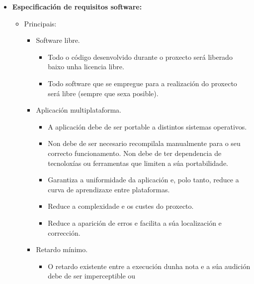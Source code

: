  \begin{itemize}
   \item \textbf{Especificación de requisitos software:}
         \begin{itemize}
          \item Principais:
                \begin{itemize}
                 \item Software libre.
                       \begin{itemize}
                        \item Todo o código desenvolvido durante o proxecto
                              será liberado baixo unha licencia libre.
                        \item Todo software que se empregue para a realización
                              do proxecto será libre  (sempre que sexa
                              posible).
                       \end{itemize}
                 \item Aplicación multiplataforma.
                       \begin{itemize}
                        \item A aplicación debe de ser portable a distintos
                              sistemas operativos.
                        \item Non debe de ser necesario recompilala manualmente
                              para o seu correcto funcionamento.
                              Non debe de ter dependencia de tecnoloxías ou
                              ferramentas que limiten a súa portabilidade.
                        \item Garantiza a uniformidade da aplicación e, polo
                              tanto, reduce a curva de aprendizaxe entre
                              plataformas.
                        \item Reduce a complexidade e os custes do proxecto.
                        \item Reduce a aparición de erros e facilita a súa
                              localización e corrección.
                       \end{itemize}
                 \item Retardo mínimo.
                       \begin{itemize}
                        \item O retardo existente entre a execución dunha nota
                              e a súa audición debe de ser imperceptible ou

\end{itemize}
\end{itemize}
\end{itemize}
\end{itemize}
